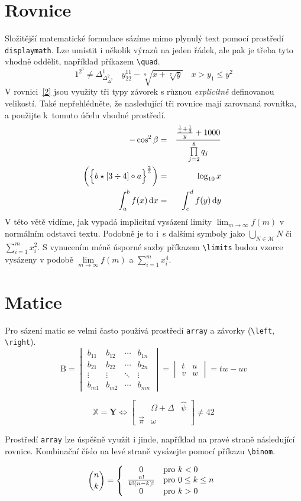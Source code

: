 \documentclass[a4paper, 11pt]{article}
\begin{document}
\section{Rovnice}
Složitější matematické formulace sázíme mimo plynulý text pomocí prostředí \verb|displaymath|. Lze umístit i několik výrazů na 
jeden řádek, ale pak je třeba tyto vhodně oddělit, například příkazem \verb|\quad|. 
$$
    1^{2^3} \neq \Delta^{1}_{\Delta^{2}_{\Delta^3}} \quad y^{11}_{22}-\sqrt[9]{x+\sqrt[7]{y}} \quad
    x > y_1 \leq y^2
$$
V rovnici~\eqref{2} jsou využity tři typy závorek s různou \emph{explicitně} definovanou velikostí. Také nepřehlédněte, že nasledující 
tři rovnice mají zarovnaná rovnítka, a použijte k~tomuto účelu vhodné prostředí.
\begin{eqnarray}
    -\cos^2{\beta}& = & \frac{\frac{\frac{1}{x}+\frac{1}{3}}{y}+1000}{ \prod\limits _{j=2}^8 q_j  } ~ \label{1}\\
    \biggl( \Bigl\{ b \star [3 \div 4]\circ a \Bigl\}^{\frac{2}{3}} \biggl) & = & \log _{10} x  ~ \label{2}\\
    \int_a^b f(x)\,\mathrm{d}x & = & \int_c^d f(y)\,\mathrm{d}y ~ \label{3}
\end{eqnarray}
V této větě vidíme, jak vypadá implicitní vysázení limity $\lim_{m \to \infty} f(m)$ v normálním odstavci textu.
Podobně je to i~s dalšími symboly jako $\bigcup_{N \in \mathcal{M}}N$ či $\sum_{i=1}^{m}x_{i}^{2}$.
S vynucením méně úsporné sazby příkazem \verb|\limits| budou vzorce vysázeny v podobě $\lim\limits_{m \to \infty} f(m)$
a $\sum\limits_{i=1}^{m}x_{i}^{4}$.

\section{Matice}
Pro sázení matic se velmi často používá prostředí \verb|array| a závorky (\verb|\left|, \verb|\right|). 
$$
\text{B} = \begin{vmatrix}
b_{11} & b_{12} & \cdots & b_{1n} \\
b_{21} & b_{22} & \cdots & b_{2n} \\
\vdots & \vdots & \ddots & \vdots \\
b_{m1} & b_{m2} & \cdots & b_{mn}
\end{vmatrix}
= \begin{vmatrix}
    t & u \\
    v & w
\end{vmatrix}
=tw -uv
$$

$$
\mathds{X} = \textbf{Y} \iff
\begin{bmatrix}
    & \Omega + \Delta & \hat{\psi} \\
\vec{\pi} & \omega &
\end{bmatrix}
\neq 42
$$

Prostředí \verb|array| lze úspěšně využít i jinde, například na pravé straně následující rovnice. Kombinační číslo na levé 
straně vysázejte pomocí příkazu \verb|\binom|.

$$ 
\binom{n}{k} = \left\{
\begin{array}{c l}
0 & \text{pro } k < 0 \\
\frac{n!}{k!(n-k)!} & \text{pro } 0 \leq k \leq n \\
0 & \text{pro } k > 0 
\end{array} \right. 
$$
\end{document}
